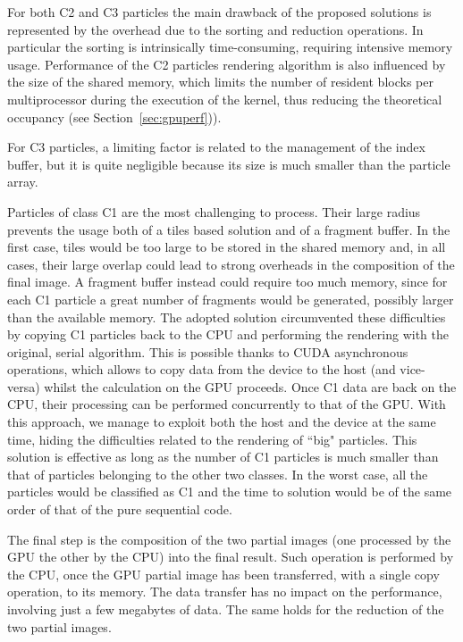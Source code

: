 \documentclass[11pt]{article}
\begin{document}
For both C2 and C3 particles the main drawback of the proposed solutions 
is represented by the overhead due to the sorting and reduction operations. In particular the sorting 
is intrinsically time-consuming, requiring intensive memory usage. 
Performance of the C2 particles rendering algorithm is also influenced 
by the size of the shared memory, which limits the number of resident blocks
per multiprocessor during the execution of the kernel, thus reducing the theoretical
occupancy (see Section~\ref{sec:gpuperf})). 
 
For C3 particles, a limiting factor is related to the management of the index buffer, but it is quite negligible because its size is much smaller than the particle array.

Particles of class C1 are the most challenging to process. Their large 
radius prevents the usage both of a tiles based solution and of a fragment buffer.
In the first case, tiles would be too large to be stored in the shared memory
and, in all cases, their large overlap could lead to strong overheads in the composition of the 
final image. A fragment buffer instead could require too much memory, since 
for each C1 particle a great number of fragments would be generated, possibly
larger than the available memory. The adopted solution circumvented these 
difficulties by copying C1 particles back to the CPU and performing the rendering 
with the original, serial algorithm. This is possible thanks to CUDA asynchronous
operations, which allows to copy data from the device to the host (and vice-versa)
whilst the calculation on the GPU proceeds. Once C1 data are back on the CPU, 
their processing can be performed concurrently to that of the GPU.  
With this approach, we manage to exploit both the host and the device
at the same time, hiding the difficulties related to the rendering of ``big"
particles. This solution is effective as long as the number of C1 particles 
is much smaller than that of particles belonging to the other two classes. 
In the worst case, all the particles would be classified as C1 and the time to solution 
would be of the same order of that of the pure sequential code. 

The final step is the composition of the two partial images (one processed by the
GPU the other by the CPU) into the final result. 
Such operation is performed by the CPU, 
once the GPU partial image has been transferred, with a single copy operation, to
its memory. The data transfer has no impact on the performance, involving just a few 
megabytes of data. The same holds for the reduction of the two partial images.   
\end{document}
